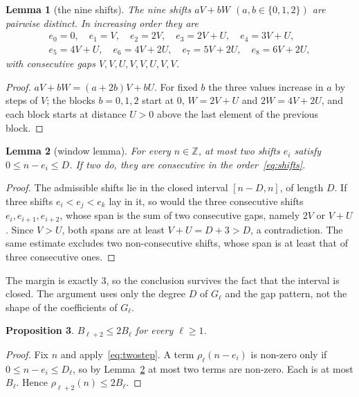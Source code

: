 \documentclass[11pt]{amsart}
\newtheorem{lemma}{Lemma}[section]
\newtheorem{proposition}[lemma]{Proposition}
\theoremstyle{definition}
\theoremstyle{remark}
\theoremstyle{plain}
\numberwithin{equation}{section}
\newcommand{\Z}{\mathbb{Z}}
\begin{document}
\begin{lemma}[the nine shifts]\label{lem:shifts}
The nine shifts $aV+bW$ $(a,b\in\{0,1,2\})$ are pairwise distinct. In increasing order they are
\begin{equation}\label{eq:shifts}
\begin{gathered}
e_0=0,\quad e_1=V,\quad e_2=2V,\quad e_3=2V+U,\quad e_4=3V+U,\\
e_5=4V+U,\quad e_6=4V+2U,\quad e_7=5V+2U,\quad e_8=6V+2U,
\end{gathered}
\end{equation}
with consecutive gaps $V,V,U,V,V,U,V,V$.
\end{lemma}

\begin{proof}
$aV+bW=(a+2b)V+bU$. For fixed $b$ the three values increase in $a$ by steps of $V$; the blocks
$b=0,1,2$ start at $0$, $W=2V+U$ and $2W=4V+2U$, and each block starts at distance $U>0$ above the
last element of the previous block.
\end{proof}

\begin{lemma}[window lemma]\label{lem:window}
For every $n\in\Z$, at most two shifts $e_i$ satisfy $0\le n-e_i\le D$. If two do, they are
consecutive in the order~\eqref{eq:shifts}.
\end{lemma}

\begin{proof}
The admissible shifts lie in the closed interval $[n-D,n]$, of length $D$. If three shifts
$e_i<e_j<e_k$ lay in it, so would the three consecutive shifts $e_i,e_{i+1},e_{i+2}$, whose span is
the sum of two consecutive gaps, namely $2V$ or $V+U$. Since $V>U$, both spans are at least
$V+U=D+3>D$, a contradiction. The same estimate excludes two non-consecutive shifts, whose span is
at least that of three consecutive ones.
\end{proof}

The margin is exactly $3$, so the conclusion survives the fact that the interval is closed. The
argument uses only the degree $D$ of $G_\ell$ and the gap pattern, not the shape of the coefficients
of $G_\ell$.

\begin{proposition}\label{prop:upper}
$B_{\ell+2}\le2B_\ell$ for every $\ell\ge1$.
\end{proposition}

\begin{proof}
Fix $n$ and apply~\eqref{eq:twostep}. A term $\rho_\ell(n-e_i)$ is non-zero only if
$0\le n-e_i\le D_\ell$, so by Lemma~\ref{lem:window} at most two terms are non-zero. Each is at most
$B_\ell$. Hence $\rho_{\ell+2}(n)\le2B_\ell$.
\end{proof}
\end{document}
